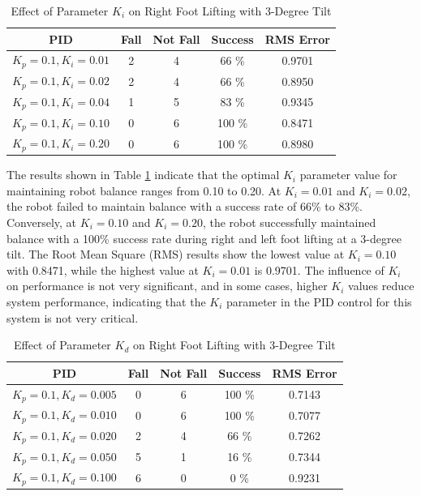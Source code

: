 \begin{enumerate}[label=\Alph*.]
    \begin{table}[h]
        \centering
        \caption{Effect of Parameter $K_i$ on Right Foot Lifting with 3-Degree Tilt}
        \begin{tabular}{|c|c|c|c|c|}
            \hline
            \textbf{PID} & \textbf{Fall} & \textbf{Not Fall} & \textbf{Success} & RMS Error \\
            \hline
            $K_p = 0.1, K_i = 0.01$ & 2 & 4 & 66 \%  & 0.9701\\
            $K_p = 0.1, K_i = 0.02$ & 2 & 4 & 66 \%  & 0.8950\\
            $K_p = 0.1, K_i = 0.04$ & 1 & 5 & 83 \%  & 0.9345\\
            $K_p = 0.1, K_i = 0.10$ & 0 & 6 & 100 \% & 0.8471\\
            $K_p = 0.1, K_i = 0.20$ & 0 & 6 & 100 \% & 0.8980\\           
            \hline
        \end{tabular}
        \label{tab:testing_pi}
    \end{table}

    \hspace*{1em} The results shown in Table \ref{tab:testing_pi} indicate that the optimal $K_i$ parameter value for maintaining robot balance ranges from 0.10 to 0.20. At $K_i = 0.01$ and $K_i = 0.02$, the robot failed to maintain balance with a success rate of 66\% to 83\%. Conversely, at $K_i = 0.10$ and $K_i = 0.20$, the robot successfully maintained balance with a 100\% success rate during right and left foot lifting at a 3-degree tilt. The Root Mean Square (RMS) results show the lowest value at $K_i = 0.10$ with 0.8471, while the highest value at $K_i = 0.01$ is 0.9701. The influence of $K_i$ on performance is not very significant, and in some cases, higher $K_i$ values reduce system performance, indicating that the $K_i$ parameter in the PID control for this system is not very critical.

    \begin{table}[h]
        \centering
        \caption{Effect of Parameter $K_d$ on Right Foot Lifting with 3-Degree Tilt}
        \begin{tabular}{|c|c|c|c|c|}
            \hline
            \textbf{PID} & \textbf{Fall} & \textbf{Not Fall} & \textbf{Success} & RMS Error \\
            \hline
            $K_p = 0.1, K_d = 0.005$ & 0 & 6 & 100 \% & 0.7143 \\
            $K_p = 0.1, K_d = 0.010$ & 0 & 6 & 100 \% & 0.7077 \\
            $K_p = 0.1, K_d = 0.020$ & 2 & 4 & 66  \% & 0.7262 \\
            $K_p = 0.1, K_d = 0.050$ & 5 & 1 & 16  \% & 0.7344 \\
            $K_p = 0.1, K_d = 0.100$ & 6 & 0 & 0   \% & 0.9231 \\          
            \hline
        \end{tabular}
        \label{tab:testing_pd}
    \end{table}


\end{enumerate}
